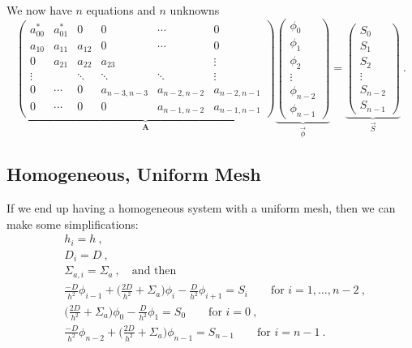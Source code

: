 \documentclass[12pt]{article}
\newcommand{\ve}[1]{\ensuremath{\mathbf{#1}}}
\begin{document}
We now have $n$ equations and $n$ unknowns
\begin{equation}
\underbrace{\begin{pmatrix}
a_{00}^* & a_{01}^* & 0      & 0 & \cdots & 0 \\
a_{10}   & a_{11}   & a_{12} & 0 & \cdots & 0 \\
0        & a_{21}   & a_{22}   & a_{23} &  & \vdots \\
\vdots        &    & \ddots  & \ddots & \ddots & \vdots \\
0 & \cdots & 0 & a_{n-3,n-3}   & a_{n-2,n-2} & a_{n-2,n-1} \\
0        & \cdots   & 0   & 0 & a_{n-1,n-2} & a_{n-1,n-1} 
\end{pmatrix}}_{\ve{A}}
%
\underbrace{\begin{pmatrix}\phi_0 \\ \phi_1 \\ \phi_2 \\ \vdots \\ \phi_{n-2} \\ \phi_{n-1} \end{pmatrix}}_{\vec{\phi}} =
%
\underbrace{\begin{pmatrix}S_0 \\ S_1 \\ S_2 \\ \vdots \\ S_{n-2} \\ S_{n-1} \end{pmatrix}}_{\vec{S}} \:. \nonumber
\end{equation}

\subsection*{Homogeneous, Uniform Mesh}

If we end up having a homogeneous system with a uniform mesh, then we can make some simplifications:
%
\begin{align}
&h_i = h\:, \nonumber \\
&D_i = D\:, \nonumber \\
&\Sigma_{a,i} = \Sigma_a\:, \quad \text{and then} \nonumber \\
%
&\frac{-D}{h^2}\phi_{i-1} + \biggl(\frac{2D}{h^2} + \Sigma_a \biggr)\phi_i - \frac{D}{h^2}\phi_{i+1} = S_i \qquad \text{for } i = 1, \dots, n-2\:, \nonumber \\
%
&\biggl(\frac{2D}{h^2} + \Sigma_a \biggr) \phi_0 - \frac{D}{h^2}\phi_{1} = S_0 \qquad \text{for } i = 0 \:,\nonumber \\
%
&\frac{-D}{h^2}\phi_{n-2} + \biggl(\frac{2D}{h^2} + \Sigma_a \biggr)\phi_{n-1} = S_{n-1} \qquad \text{for } i = n-1\:. \nonumber
\end{align}
\end{document}
